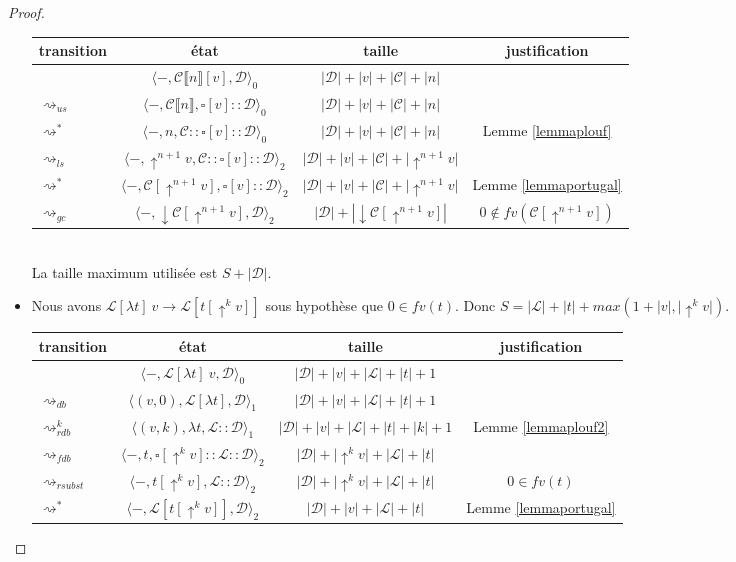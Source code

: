 \documentclass[11pt,a4paper]{article}
\theoremstyle{definition}
\newcommand{\etatz}[1]{\langle #1 \rangle_0}
\newcommand{\etatu}[1]{\langle #1 \rangle_1}
\newcommand{\etatd}[1]{\langle #1 \rangle_2}
\newcommand{\mcd}{\mathcal{D}}
\newcommand{\mcc}{\mathcal{C}}
\newcommand{\mcl}{\mathcal{L}}
\newcommand{\mtd}{\mathcal{D}}
\newcommand{\mtl}{\mathcal{L}}
\newcommand{\da}{\downarrow}
\newcommand{\ua}{\uparrow}
\begin{document}
\begin{proof}
\begin{itemize}
\begin{tabular}{@{}l c c c@{}}
        \toprule
        transition & état & taille & justification\\
        \midrule
                   & $\etatz{-,\mcc\llbracket n\rrbracket[v],\mcd}$ & $|\mcd|+|v|+|\mcc|+|n|$\\
        $\rightsquigarrow_{us}$ & $ \etatz{-, \mcc\llbracket n \rrbracket, \square[v]::\mcd}$ & $|\mcd| + |v| + |\mcc|+|n|$\\ 
        $\rightsquigarrow^*$ & $ \etatz{-, n ,\mcc:: \square[v]::\mcd}$ & $|\mcd| + |v| + |\mcc|+|n|$& Lemme \ref{lemmaplouf}\\
        $\rightsquigarrow_{ls}$ & $ \etatd{-, \ua^{n+1} v ,\mcc:: \square[v]::\mcd}$ & $|\mcd| + |v| + |\mcc|+|\ua^{n+1} v|$\\
        $\rightsquigarrow^*$ & $ \etatd{-, \mcc[\ua^{n+1} v], \square[v]::\mcd}$ & $|\mcd| + |v| + |\mcc| +|\ua^{n+1} v|$ &Lemme \ref{lemmaportugal}\\ 
        $\rightsquigarrow_{gc}$ & $ \etatd{-, \da \mcc[\ua^{n+1} v], \mcd}$ & $|\mcd| + |\da \mcc[\ua^{n+1} v]|$& $0\notin fv(\mcc[\ua^{n+1} v])$\\ 
        \bottomrule
      \end{tabular}\\
      La taille maximum utilisée est $S+|\mcd|$.
    \item {} Nous avons $\mcl[\lambda t]~v \rightarrow \mcl[t[\ua^{k} v]]$ sous hypothèse que $0\in fv(t)$. Donc $S = |\mcl|+|t|+max(1+|v|, |\ua^k v|)$.\\
      \begin{tabular}{@{}l c c c@{}}
        \toprule
        transition & état & taille & justification\\
        \midrule
                   & $\etatz{-,\mcl[\lambda t]~v,\mcd}$ & $|\mcd|+|v|+|\mcl|+|t|+1$\\
        $\rightsquigarrow_{db}$ & $ \etatu{(v,0), \mcl[ \lambda t], \mcd}$ & $|\mcd| + |v| + |\mcl|+|t|+1$\\ 
        $\rightsquigarrow^k_{rdb}$ & $ \etatu{(v,k), \lambda t ,\mtl::\mtd}$ & $|\mtd| + |v| + |\mtl|+|t|+|k|+1$& Lemme \ref{lemmaplouf2}\\
        $\rightsquigarrow_{fdb}$ & $ \etatd{-, t ,\square[\ua^k v]::\mtl::\mtd}$ & $|\mtd| + |\ua^k v| + |\mtl|+|t|$\\
        $\rightsquigarrow_{rsubst}$ & $ \etatd{-, t[\ua^k v] ,\mtl::\mtd}$ & $|\mtd| +|\ua^k v|+ |\mtl|+|t|$& $0 \in fv(t)$\\
        $\rightsquigarrow^*$ & $ \etatd{-, \mtl[t[\ua^k v]],\mtd}$ & $|\mtd| + |v| + |\mtl|+|t|$ &Lemme \ref{lemmaportugal}\\ 

\end{tabular}
\end{itemize}
\end{proof}
\end{document}
